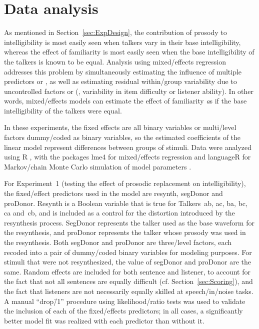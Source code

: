 \section{Data analysis\label{sec:DataAnal}}
As mentioned in Section~\ref{sec:ExpDesign}, the contribution of prosody to intelligibility is most easily seen when talkers vary in their base intelligibility, whereas the effect of familiarity is most easily seen when the base intelligibility of the talkers is known to be equal.  Analysis using mixed\-/effects regression addresses this problem by simultaneously estimating the influence of multiple predictors or , as well as estimating residual within\-/group variability due to uncontrolled factors or  (\eg, variability in item difficulty or listener ability).  In other words, mixed\-/effects models can estimate the effect of familiarity {\emph as if} the base intelligibility of the talkers were equal.

In these experiments, the fixed effects are all binary variables or multi\-/level factors dummy\-/coded as binary variables, so the estimated coefficients of the linear model represent differences between groups of stimuli.  Data were analyzed using R \citep{R}, with the packages {\inlinecode lme4} for mixed\-/effects regression \citep{lmer} and {\inlinecode languageR} for Markov\-/chain Monte Carlo simulation of model parameters \citep{languageR}.

For Experiment~1 (testing the effect of prosodic replacement on intelligibility), the fixed\-/effect predictors used in the model are {\inlinecode resynth}, {\inlinecode segDonor} and {\inlinecode proDonor}.  {\inlinecode Resynth} is a Boolean variable that is true for Talkers~\ac{ab}, \ac{ac}, \ac{ba}, \ac{bc}, \ac{ca} and~\ac{cb}, and is included as a control for the distortion introduced by the resynthesis process.  {\inlinecode SegDonor} represents the talker used as the base waveform for the resynthesis, and {\inlinecode proDonor} represents the talker whose prosody was used in the resynthesis.  Both {\inlinecode segDonor} and {\inlinecode proDonor} are three\-/level factors, each recoded into a pair of dummy\-/coded binary variables for modeling purposes.  For stimuli that were not resynthesized, the value of {\inlinecode segDonor} and {\inlinecode proDonor} are the same.  Random effects are included for both sentence and listener, to account for the fact that not all sentences are equally difficult (cf. Section~\ref{sec:Scoring}), and the fact that listeners are not necessarily equally skilled at speech\-/in\-/noise tasks.  A manual “drop\=/1” procedure using likelihood\-/ratio tests was used to validate the inclusion of each of the fixed\-/effects predictors; in all cases, a significantly better model fit was realized with each predictor than without it.

